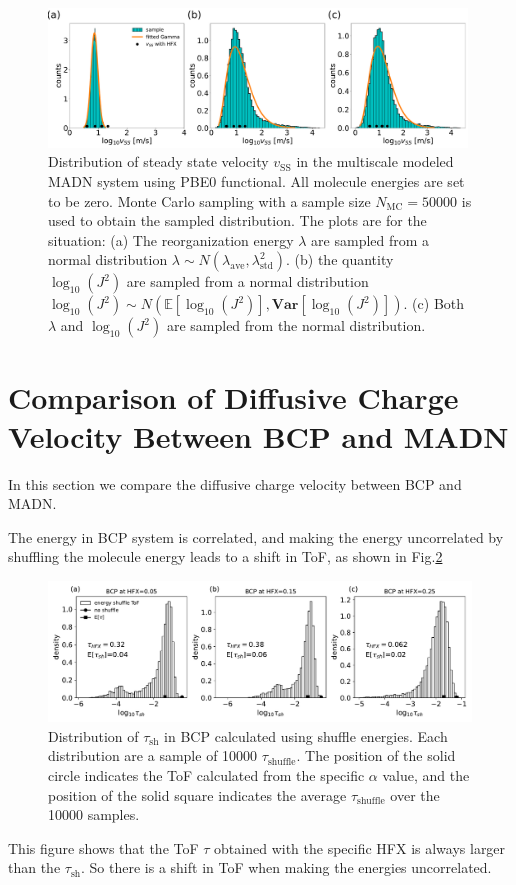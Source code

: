 \documentclass[letterpaper,12pt]{article}
\begin{document}
\begin{figure}[H]
    \centering
    \includegraphics[width=0.99\textwidth]{figs/MADN_HFX/fig_mle_MADN_noE_SS.pdf}
    \caption{Distribution of steady state velocity $v_\text{SS}$ in the multiscale modeled MADN system using PBE0 functional. All molecule energies are set to be zero.  
    Monte Carlo sampling with a sample size $N_\text{MC}=50000$ is used to obtain the sampled distribution.
    The plots are for the situation: (a) The reorganization energy $\lambda$ are sampled from a normal distribution $\lambda \sim N(\lambda_\text{ave},\lambda^2_\text{std})$. (b) the quantity $\log_{10}(J^2)$ are sampled from a normal distribution $\log_{10}(J^2) \sim N(\mathbb{E}[\log_{10}(J^2)], \textbf{Var}[\log_{10}(J^2)] )$. (c) Both $\lambda$ and $\log_{10}(J^2)$ are sampled from the normal distribution. }
    \label{fig:mle_MADN_noE_SS}
\end{figure}
 
\section{Comparison of Diffusive Charge Velocity Between BCP and MADN}

In this section we compare the diffusive charge velocity between BCP and MADN. 

The energy in BCP system is correlated, and making the energy uncorrelated by shuffling the molecule energy leads to a shift in ToF, as shown in Fig.\ref{fig:ToF_shuffle_BCP}
%
\begin{figure}[H]
    \centering
    \includegraphics[width=\textwidth]{figs/BCP_HFX/ToFx_shuffle.pdf}
    \caption{Distribution of $\tau_{\text{sh}}$ in BCP calculated using shuffle energies. Each distribution are a sample of 10000 $\tau_{\text{shuffle}}$. The position of the solid circle indicates the ToF calculated from the specific $\alpha$ value, and the position of the solid square indicates the average $\tau_{\text{shuffle}}$ over the 10000 samples.}
    \label{fig:ToF_shuffle_BCP}
\end{figure}
%
This figure shows that the ToF $\tau$ obtained with the specific HFX is always larger than the $\tau_\text{sh}$.
So there is a shift in ToF when making the energies uncorrelated. 
\end{document}
